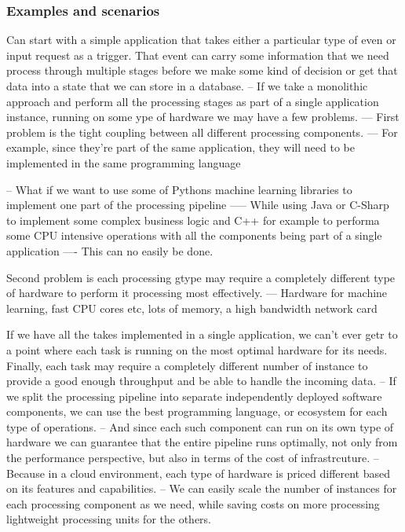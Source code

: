 \documentclass[a4paper, 11pt]{book}
\begin{document}
    \subsubsection{Examples and scenarios}
    Can start with a simple application that takes either a particular type of even or input request as a trigger.
    That event can carry some information that we need process through multiple stages before we make some kind of decision or get that data into a state that we can store in a database.
    -- If we take a monolithic approach and perform all the processing stages as part of a single application instance, running on some ype of hardware we may have a few problems.
    --- First problem is the tight coupling between all different processing components.
    --- For example, since they're part of the same application, they will need to be implemented in the same programming language

    -- What if we want to use some of Pythons machine learning libraries to implement one part of the processing pipeline
    ----- While using Java or C-Sharp to implement some complex business logic and C++ for example to performa some CPU intensive operations with all the components being part of a single application
    ---- This can no easily be done.

    Second problem is each processing gtype may require a completely different type of hardware to perform it processing most effectively.
    --- Hardware for machine learning, fast CPU cores etc, lots of memory, a high bandwidth network card

    If we have all the takes implemented in a single application, we can't ever getr to a point where each task is running on the most optimal hardware for its needs.
    Finally, each task may require a completely different number of instance to provide a good enough throughput and be able to handle the incoming data.
    -- If we split the processing pipeline into separate independently deployed software components, we can use the best programming language, or ecosystem for each type of operations.
    -- And since each such component can run on its own type of hardware we can guarantee that the entire pipeline runs optimally, not only from the performance perspective, but also in terms of the cost of infrastrcuture.
    -- Because in a cloud environment, each type of hardware is priced different based on its features and capabilities.
    -- We can easily scale the number of instances for each processing component as we need, while saving costs on more processing lightweight processing units for the others.
\end{document}
